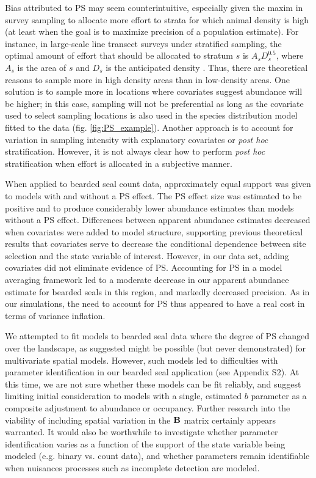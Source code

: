 \documentclass[times,mee,doublespace,]{besauth2}
\begin{document}
Bias attributed to PS may seem counterintuitive, especially given the maxim in survey sampling to allocate more effort to strata for which animal density is high (at least when the goal is to maximize precision of a population estimate). For instance, in large-scale line transect surveys under stratified sampling, the optimal amount of effort that should be allocated to stratum $s$ is $A_s D_s^{0.5}$, where $A_s$ is the area of $s$ and $D_s$ is the anticipated density \citep[][eqn 7.7]{BucklandEtAl2001}.  Thus, there are theoretical reasons to sample more in high density areas than in low-density areas. One solution is to sample more in locations where covariates suggest abundance will be higher; in this case, sampling will not be preferential as long as the covariate used to select sampling locations is also used in the species distribution model fitted to the data (fig. \ref{fig:PS_example}).  Another approach is to account for variation in sampling intensity with explanatory covariates or \textit{post hoc} stratification. However, it is not always clear how to perform \textit{post hoc} stratification when effort is allocated in a subjective manner.

When applied to bearded seal count data, approximately equal support was given to models with and without a PS effect.  The PS effect size was estimated to be positive and to produce considerably lower abundance estimates than models without a PS effect.  Differences between apparent abundance estimates decreased when covariates were added to model structure, supporting previous theoretical results \citep{DiggleEtAl2010,PatiEtAl2011} that covariates serve to decrease the conditional dependence between site selection and the state variable of interest.  However, in our data set, adding covariates did not eliminate evidence of PS. Accounting for PS in a model averaging framework led to a moderate decrease in our apparent abundance estimate for bearded seals in this region, and markedly decreased precision.  As in our simulations, the need to account for PS thus appeared to have a real cost in terms of variance inflation.

We attempted to fit models to bearded seal data where the degree of PS changed over the landscape, as \citet{RoyleBerliner1999} suggested might be possible (but never demonstrated) for multivariate spatial models. However, such models led to difficulties with parameter identification in our bearded seal application (see Appendix S2).  At this time, we are not sure whether these models can be fit reliably, and suggest limiting initial consideration to models with a single, estimated $b$ parameter as a composite adjustment to abundance or occupancy.  Further research into the viability of including spatial variation in the ${\bf B}$ matrix certainly appears warranted.  It would also be worthwhile to investigate whether parameter identification varies as a function of the support of the state variable being modeled (e.g. binary vs. count data), and whether parameters remain identifiable when nuisances processes such as incomplete detection are modeled.
\end{document}

